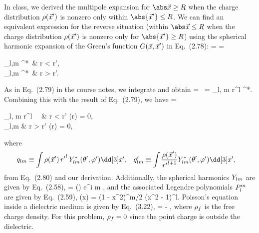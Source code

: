 \begin{solution}
	In class, we derived the multipole expansion for $\absx \geq R$ when the charge distribution $\rho(\vec{x}')$ is nonzero only within $\abs{\vx'} \leq R$.  We can find an equivalent expression for the reverse situation (within $\absx \leq R$ when the charge distribution $\rho(\vec{x}')$ is nonzero only for $\abs{\vx'} \geq R$) using the spherical harmonic expansion of the Green's function $G(\vec{x}, \vec{x}')$ in Eq.~(2.78):
	\beq
		\Gxxp = 
		= \begin{cases} \sum_{l,m}   \Ylm^*\tvp \, \Ylm\tv & \tif r < r', \\
		\sum_{l,m}   \Ylm^*\tvp \, \Ylm\tv & \tif r > r'. \end{cases}
	\eeq
	As in Eq.~(2.79) in the course notes, we integrate and obtain
	\beq
		\phix = \int \Gxxp \, \rhoxp \dcxp
		= \sum_{l, m}  r^l \Ylm\tv \int {} \Ylm^*\tvp \dcxp.
	\eeq
	Combining this with the result of Eq.~(2.79), we have
	\beqn \label{multipole}
		\phix = \begin{cases} \sum_{l, m}  r^l \, \qplm \, \Ylm\tv & \tif r < r'  \rhoxp(r) = 0, \\
		\sum_{l,m}   \Ylm\tv & \tif r > r'   \rhoxp(r) = 0, \end{cases}
	\eeqn
	where
	\begin{align*}
		\qlm &\equiv \int \rhoxp \, {r'}^l \, \Ylm^*\tvp \dcxp, &
		\qplm &\equiv \int \frac{\rhoxp}{{r'}^{l+1}} \Ylm^*\tvp \dcxp,
	\end{align*}
	from Eq.~(2.80) and our derivation.  Additionally, the spherical harmonics $Y_{l m}$ are given by Eq.~(2.58),
	\beq
		\Ylm\tv =   \Plm(\cost) e^{i m \vph},
	\eeq
	and the associated Legendre polynomials $P_l^m$ are given by Eq.~(2.59),
	\beq
		\Plm(x) =  (1 - x^2)^{m/2}  (x^2 - 1)^l.
	\eeq	
	Poisson's equation inside a dielectric medium is given by Eq.~(3.22),
	\beqn \label{poissdie}
		\lap\evphi = -\frac{4\pi}{\eps} \ev{\rhof},
	\eeqn
	where $\rho_f$ is the free charge density.  For this problem, $\rho_f = 0$ since the point charge is outside the dielectric.
	

\end{solution}
